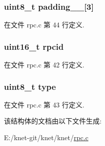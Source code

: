 \subsubsection[{padding\+\_\+\+\_\+}]{\setlength{\rightskip}{0pt plus 5cm}uint8\+\_\+t padding\+\_\+\+\_\+\mbox{[}3\mbox{]}}\label{structkrpc__header__t_a40bcd7707eaaaa86e933724ca2371510}


在文件 rpc.\+c 第 44 行定义.

\hypertarget{structkrpc__header__t_aff565cee9af9d43e0a128d368f15ef70}{}
\subsubsection[{rpcid}]{\setlength{\rightskip}{0pt plus 5cm}uint16\+\_\+t rpcid}\label{structkrpc__header__t_aff565cee9af9d43e0a128d368f15ef70}


在文件 rpc.\+c 第 42 行定义.

\hypertarget{structkrpc__header__t_a1d127017fb298b889f4ba24752d08b8e}{}
\subsubsection[{type}]{\setlength{\rightskip}{0pt plus 5cm}uint8\+\_\+t type}\label{structkrpc__header__t_a1d127017fb298b889f4ba24752d08b8e}


在文件 rpc.\+c 第 43 行定义.



该结构体的文档由以下文件生成\+:\begin{DoxyCompactItemize}
\item 
E\+:/knet-\/git/knet/knet/\hyperlink{knet_2rpc_8c}{rpc.\+c}\end{DoxyCompactItemize}
